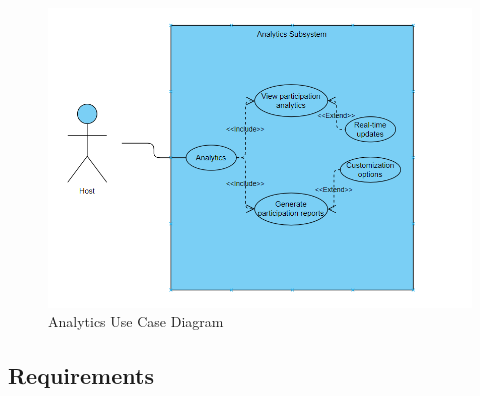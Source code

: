 \documentclass[a4paper,12pt]{article}
\begin{document}
\begin{figure}[H]
    \centering
    \includegraphics[width=\textwidth]{AnalyticsSubsystem.png}
    \caption{Analytics Use Case Diagram}
    \label{fig:use-case-diagram}
\end{figure}

\subsection{Requirements}
\end{document}
